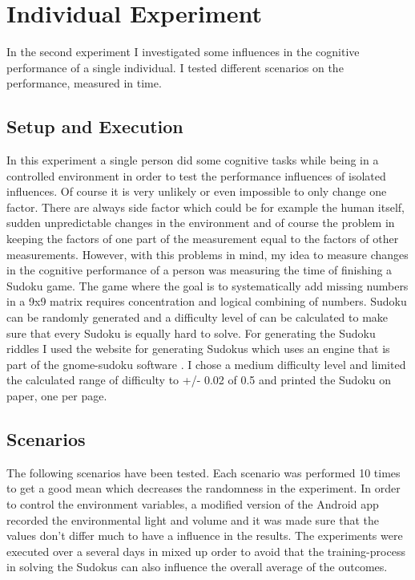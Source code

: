 { 
\section{Individual Experiment}
In the second experiment I investigated some influences in the cognitive performance of a single individual. I tested different scenarios on the performance, measured in time. 

\subsection{Setup and Execution}
In this experiment a single person did some cognitive tasks while being in a controlled environment in order to test the performance influences of isolated influences. Of course it is very unlikely or even impossible to only change one factor. There are always side factor which could be for example the human itself, sudden unpredictable changes in the environment and of course the problem in keeping the factors of one part of the measurement equal to the factors of other measurements. 
However, with this problems in mind, my idea to measure changes in the cognitive performance of a person was measuring the time of finishing a Sudoku game. 
The game where the goal is to systematically add missing numbers in a 9x9 matrix requires concentration and logical combining of numbers. 
Sudoku can be randomly generated and a difficulty level of can be calculated to make sure that every Sudoku is equally hard to solve. 
For generating the Sudoku riddles I used the website for generating Sudokus \cite{sudokugen} which uses an engine that is part of the gnome-sudoku software \cite{gnomeSudoku}. 
I chose a medium difficulty level and limited the calculated range of difficulty to +/- 0.02 of 0.5 and printed the Sudoku on paper, one per page. 

\subsection{Scenarios}
The following scenarios have been tested. Each scenario was performed 10 times to get a good mean which decreases the randomness in the experiment. In order to control the environment variables, a modified version of the Android app recorded the environmental light and volume and it was made sure that the values don't differ much to have a influence in the results. 
The experiments were executed over a several days in mixed up order to avoid that the training-process in solving the Sudokus can also influence the overall average of the outcomes.

}
